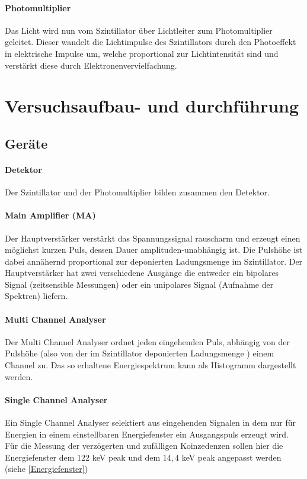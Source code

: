 \documentclass[12pt]{article}
\begin{document}
 \paragraph{Photomultiplier}
 Das Licht wird nun vom Szintillator über Lichtleiter zum Photomultiplier geleitet. Dieser wandelt die Lichtimpulse des Szintillators durch den Photoeffekt in elektrische Impulse um, welche proportional zur Lichtintensität sind und verstärkt diese durch Elektronenvervielfachung.
 

 
\newpage
\section{Versuchsaufbau- und durchführung}
\subsection{Geräte}

\paragraph{Detektor} Der Szintillator und der Photomultiplier bilden zusammen den Detektor.
\paragraph{Main Amplifier (MA)}
Der Hauptverstärker  verstärkt das Spannungssignal rauscharm und erzeugt einen möglichst kurzen Puls, dessen Dauer amplituden-unabhängig ist. Die Pulshöhe ist dabei annähernd proportional zur deponierten Ladungsmenge im Szintillator. Der Hauptverstärker hat zwei verschiedene Ausgänge die entweder ein bipolares Signal (zeitsensible Messungen) oder ein unipolares Signal (Aufnahme der Spektren) liefern.
\paragraph{Multi Channel Analyser}
Der Multi Channel Analyser ordnet jeden eingehenden Puls, abhängig von der Pulshöhe (also von der im Szintillator deponierten Ladungsmenge ) einem Channel zu. Das so erhaltene Energiespektrum kann als Histogramm dargestellt werden.
\paragraph{Single Channel Analyser}
Ein Single Channel Analyser selektiert aus eingehenden Signalen in dem nur für Energien in einem einstellbaren Energiefenster ein Ausgangspuls erzeugt wird.  Für die Messung der verzögerten und zufälligen Koinzedenzen sollen hier die Energiefenster dem $122$ keV peak und dem $14,4$ keV peak angepasst werden (siehe \ref{Energiefenster})
\end{document}
